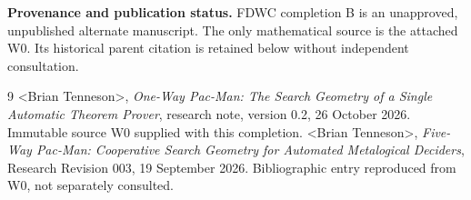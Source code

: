 \documentclass[11pt,letterpaper]{article}
\theoremstyle{definition}
\theoremstyle{remark}
\newcommand{\AuthorTag}{\textless{}Brian Tenneson\textgreater{}}
\begin{document}
\medskip\noindent\textbf{Provenance and publication status.} FDWC completion B is an unapproved, unpublished alternate manuscript. The only mathematical source is the attached W0. Its historical parent citation is retained below without independent consultation.
\begin{thebibliography}{9}
 \AuthorTag, \emph{One-Way Pac-Man: The Search Geometry of a Single Automatic Theorem Prover}, research note, version 0.2, 26 October 2026. Immutable source W0 supplied with this completion.
 \AuthorTag, \emph{Five-Way Pac-Man: Cooperative Search Geometry for Automated Metalogical Deciders}, Research Revision 003, 19 September 2026. Bibliographic entry reproduced from W0, not separately consulted.
\end{thebibliography}
\end{document}

